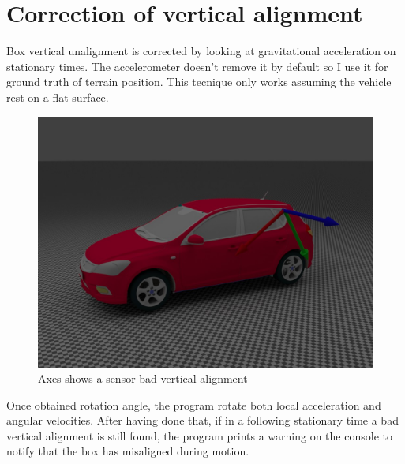 \section{Correction of vertical alignment}
Box vertical unalignment is corrected by looking at gravitational acceleration on stationary times. The accelerometer doesn't remove it by default so I use it for ground truth of terrain position. This tecnique only works assuming the vehicle rest on a flat surface. 
\begin{figure}[H]
\includegraphics[width=\textwidth]{kia_bad_z_align.jpg}
\caption{Axes shows a sensor bad vertical alignment}
\end{figure}

Once obtained rotation angle, the program rotate both local acceleration and angular velocities. After having done that, if in a following stationary time a bad vertical alignment is still found, the program prints a warning on the console to notify that the box has misaligned during motion.

